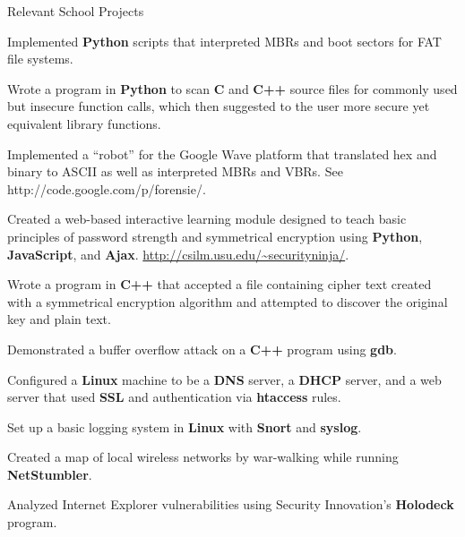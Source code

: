 
\begin{rSectionHeading}{Relevant School Projects}
  \begin{rBulletList}

    \item Implemented \textbf{Python} scripts that interpreted MBRs and boot sectors for FAT file systems.

    \item Wrote a program in \textbf{Python} to scan \textbf{C} and \textbf{C++} source files for commonly used but insecure function calls, which then suggested to the user more secure yet equivalent library functions.

    \item Implemented a ``robot'' for the Google Wave platform that translated hex and binary to ASCII as well as interpreted MBRs and VBRs. See http://code.google.com/p/forensie/.

    \item Created a web-based interactive learning module designed to teach basic principles of password strength and symmetrical encryption using \textbf{Python}, \textbf{JavaScript}, and \textbf{Ajax}. \href{http://csilm.usu.edu/~securityninja/}{http://csilm.usu.edu/\textasciitilde securityninja/}.

    \item Wrote a program in \textbf{C++} that accepted a file containing cipher text created with a symmetrical encryption algorithm and attempted to discover the original key and plain text.

    \item Demonstrated a buffer overflow attack on a \textbf{C++} program using \textbf{gdb}.

    \item Configured a \textbf{Linux} machine to be a \textbf{DNS} server, a \textbf{DHCP} server, and a web server that used \textbf{SSL} and authentication via \textbf{htaccess} rules.

    \item Set up a basic logging system in \textbf{Linux} with \textbf{Snort} and \textbf{syslog}.

    \item Created a map of local wireless networks by war-walking while running \textbf{NetStumbler}.

    \item Analyzed Internet Explorer vulnerabilities using Security Innovation's \textbf{Holodeck} program.

  \end{rBulletList}

\end{rSectionHeading}
